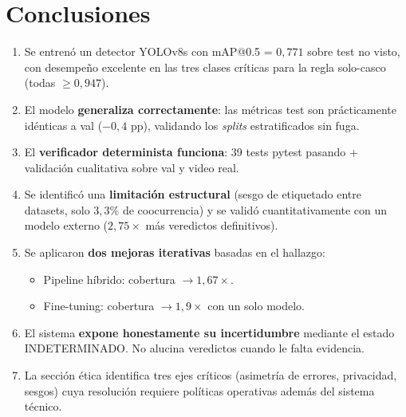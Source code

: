 \documentclass[11pt,a4paper]{article}
\begin{document}
\section{Conclusiones}

\begin{enumerate}[leftmargin=*]
    \item Se entrenó un detector YOLOv8s con mAP@0.5 = $0{,}771$ sobre
    test no visto, con desempeño excelente en las tres clases críticas
    para la regla solo-casco (todas $\geq 0{,}947$).

    \item El modelo \textbf{generaliza correctamente}: las métricas
    test son prácticamente idénticas a val ($-0{,}4$ pp), validando los
    \textit{splits} estratificados sin fuga.

    \item El \textbf{verificador determinista funciona}: 39 tests
    pytest pasando + validación cualitativa sobre val y video real.

    \item Se identificó una \textbf{limitación estructural} (sesgo de
    etiquetado entre datasets, solo $3{,}3\%$ de coocurrencia) y se
    validó cuantitativamente con un modelo externo
    ($2{,}75 \times$ más veredictos definitivos).

    \item Se aplicaron \textbf{dos mejoras iterativas} basadas en el
    hallazgo:
    \begin{itemize}
        \item Pipeline híbrido: cobertura $\to 1{,}67 \times$.
        \item Fine-tuning: cobertura $\to 1{,}9 \times$ con un solo
        modelo.
    \end{itemize}

    \item El sistema \textbf{expone honestamente su incertidumbre}
    mediante el estado INDETERMINADO. No alucina veredictos cuando le
    falta evidencia.

    \item La sección ética identifica tres ejes críticos (asimetría de
    errores, privacidad, sesgos) cuya resolución requiere políticas
    operativas además del sistema técnico.
\end{enumerate}

\appendix
\end{document}
